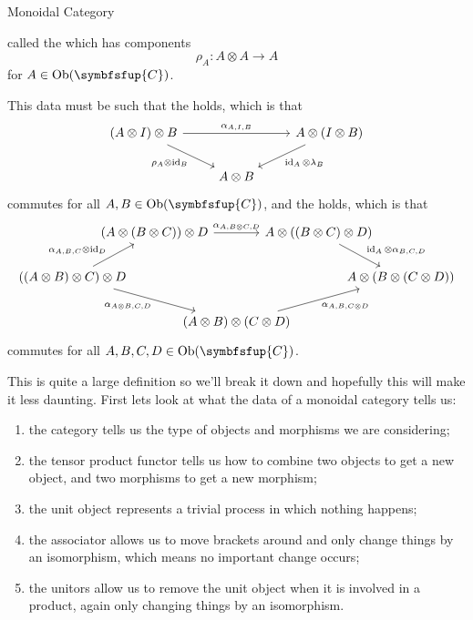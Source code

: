 \documentclass[fleqn]{NotesClass}
\newcommand{\cat}[1]{\symbfsfup{#1}}
\DeclareMathOperator{\Ob}{Ob}
\DeclareMathOperator{\id}{id}
\begin{document}
\begin{dfn}{Monoidal Category}{}
\begin{enumerate}
\begin{equation}
            \end{equation}
            called the  which has components
            \begin{equation}
                \rho_A \colon A \otimes A \to A
            \end{equation}
            for \(A \in \Ob(\cat{C})\).
        \end{enumerate}
        This data must be such that the  holds, which is that 
        \begin{equation}
            \begin{tikzcd}
                (A \otimes I) \otimes B \arrow[rr, "\alpha_{A, I, B}"] \arrow[dr, "\rho_A \otimes \id_B"'] && A \otimes (I \otimes B) \arrow[dl, "\id_A \otimes \lambda_B"]\\
                & A \otimes B &
            \end{tikzcd}
        \end{equation}
        commutes for all \(A, B \in \Ob(\cat{C})\), and the  holds, which is that
        \begin{equation}
            \begin{tikzcd}[column sep=-1cm]
                & (A \otimes (B \otimes C)) \otimes D \arrow[rr, "\alpha_{A, B \otimes C, D}"] && A \otimes ((B \otimes C) \otimes D) \arrow[dr, "\id_A \otimes \alpha_{B,C,D}", pos=0.6] & \\
                ((A \otimes B) \otimes C) \otimes D \arrow[ur, "\alpha_{A,B,C} \otimes \id_D", pos=0.4] \arrow[drr, "\alpha_{A\otimes B,C,D}"'] &&&& A \otimes (B \otimes (C \otimes D)) \\
                && (A \otimes B) \otimes (C \otimes D) \arrow[urr, "\alpha_{A,B,C\otimes D}"'] && 
            \end{tikzcd}
        \end{equation}
        commutes for all \(A, B, C, D \in \Ob(\cat{C})\).
    \end{dfn}
    
    This is quite a large definition so we'll break it down and hopefully this will make it less daunting.
    First lets look at what the data of a monoidal category tells us:
    \begin{enumerate}
        \item the category tells us the type of objects and morphisms we are considering;
        \item the tensor product functor tells us how to combine two objects to get a new object, and two morphisms to get a new morphism;
        \item the unit object represents a trivial process in which nothing happens;
        \item the associator allows us to move brackets around and only change things by an isomorphism, which means no important change occurs;
        \item the unitors allow us to remove the unit object when it is involved in a product, again only changing things by an isomorphism.
    \end{enumerate}
    
\end{document}

